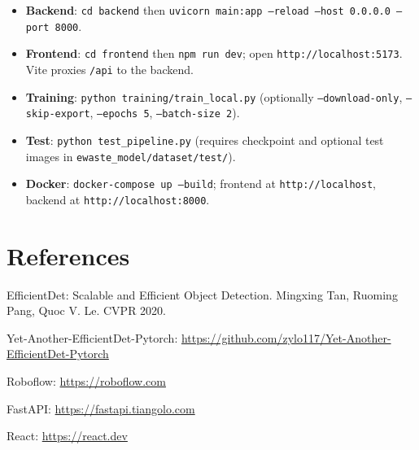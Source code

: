 \documentclass[11pt,a4paper]{article}
\begin{document}
\begin{itemize}[noitemsep]
    \item \textbf{Backend}: \texttt{cd backend} then \texttt{uvicorn main:app --reload --host 0.0.0.0 --port 8000}.
    \item \textbf{Frontend}: \texttt{cd frontend} then \texttt{npm run dev}; open \texttt{http://localhost:5173}. Vite proxies \texttt{/api} to the backend.
    \item \textbf{Training}: \texttt{python training/train\_local.py} (optionally \texttt{--download-only}, \texttt{--skip-export}, \texttt{--epochs 5}, \texttt{--batch-size 2}).
    \item \textbf{Test}: \texttt{python test\_pipeline.py} (requires checkpoint and optional test images in \texttt{ewaste\_model/dataset/test/}).
    \item \textbf{Docker}: \texttt{docker-compose up --build}; frontend at \texttt{http://localhost}, backend at \texttt{http://localhost:8000}.
\end{itemize}

\section*{References}

\begin{enumerate}[label={[\arabic*]}]
    \item EfficientDet: Scalable and Efficient Object Detection. Mingxing Tan, Ruoming Pang, Quoc V. Le. CVPR 2020.
    \item Yet-Another-EfficientDet-Pytorch: \url{https://github.com/zylo117/Yet-Another-EfficientDet-Pytorch}
    \item Roboflow: \url{https://roboflow.com}
    \item FastAPI: \url{https://fastapi.tiangolo.com}
    \item React: \url{https://react.dev}
\end{enumerate}
\end{document}
